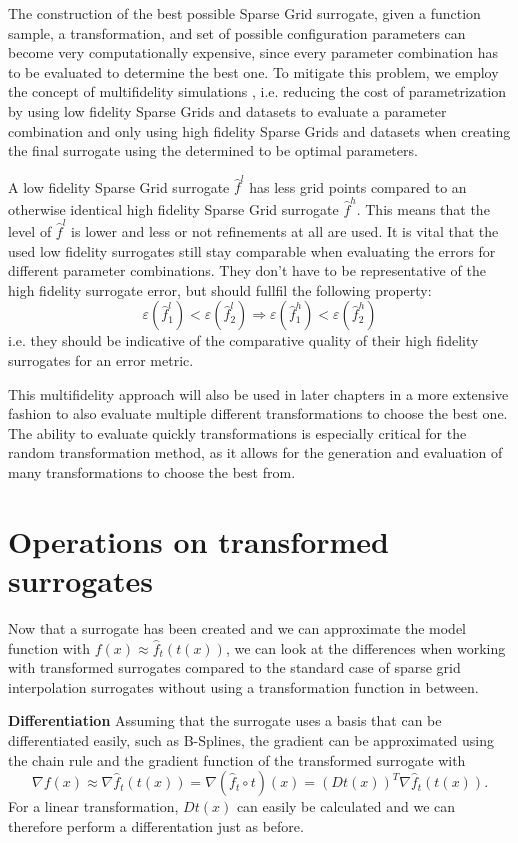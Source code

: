 \documentclass[
  a4paper,  %
  twoside,  %
  bibliography=totoc,
  headsepline,
  cleardoublepage=empty,
  parskip=half,
  draft=false
]{scrbook}
\begin{document}
The construction of the best possible Sparse Grid surrogate, given a function sample, a transformation, and set of possible configuration parameters can become very computationally expensive, since every parameter combination has to be evaluated to determine the best one.
To mitigate this problem, we employ the concept of multifidelity simulations \cite{}, i.e. reducing the cost of parametrization by using low fidelity Sparse Grids and datasets to evaluate a parameter combination and only using high fidelity Sparse Grids and datasets when creating the final surrogate using the determined to be optimal parameters.

A low fidelity Sparse Grid surrogate $\hat{f}^l$ has less grid points compared to an otherwise identical high fidelity Sparse Grid surrogate $\hat{f}^h$.
This means that the level of $\hat{f}^l$ is lower and less or not refinements at all are used.
It is vital that the used low fidelity surrogates still stay comparable when evaluating the errors for different parameter combinations.
They don't have to be representative of the high fidelity surrogate error, but should fullfil the following property:
\begin{equation}
\varepsilon(\hat{f}_1^l) < \varepsilon(\hat{f}_2^l) \Rightarrow \varepsilon(\hat{f}_1^h) < \varepsilon(\hat{f}_2^h)
\end{equation}
i.e. they should be indicative of the comparative quality of their high fidelity surrogates for an error metric.

This multifidelity approach will also be used in later chapters in a more extensive fashion to also evaluate multiple different transformations to choose the best one.
The ability to evaluate quickly transformations is especially critical for the random transformation method, as it allows for the generation and evaluation of many transformations to choose the best from.

\section{Operations on transformed surrogates}

Now that a surrogate has been created and we can approximate the model function with $f(x) \approx \hat{f}_t(t(x))$,
we can look at the differences when working with transformed surrogates compared to the standard case of sparse grid interpolation surrogates without using a transformation function in between.

\textbf{Differentiation }
Assuming that the surrogate uses a basis that can be differentiated easily, such as B-Splines, the gradient can be approximated using the chain rule and the gradient function of the transformed surrogate with
\begin{equation}
\nabla f(x) \approx \nabla \hat{f}_t(t(x)) = \nabla (\hat{f}_t \circ t)(x)=(Dt(x))^T \nabla \hat{f}_t(t(x)).
\end{equation}
For a linear transformation, $Dt(x)$ can easily be calculated and we can therefore perform a differentation just as before.
\end{document}
